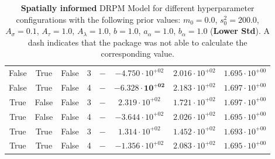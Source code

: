 \documentclass[12pt,a4paper]{article}
\begin{document}
\begin{table}
\begin{tabular}{cccccccc}
False & True & False & 3 & $-$ & $-4.750 \cdot 10^{+02}$ & $2.016 \cdot 10^{+02}$ & $1.695 \cdot 10^{+00}$ \\
False & True & False & 4 & $-$ & $\mathbf{-6.328 \cdot 10^{+02}}$ & $2.183 \cdot 10^{+02}$ & $1.697 \cdot 10^{+00}$ \\
True & False & False & 3 & $-$ & $2.319 \cdot 10^{+02}$ & $1.721 \cdot 10^{+02}$ & $1.697 \cdot 10^{+00}$ \\
True & False & False & 4 & $-$ & $-3.644 \cdot 10^{+02}$ & $2.026 \cdot 10^{+02}$ & $1.695 \cdot 10^{+00}$ \\
True & True & False & 3 & $-$ & $1.314 \cdot 10^{+02}$ & $1.452 \cdot 10^{+02}$ & $1.693 \cdot 10^{+00}$ \\
True & True & False & 4 & $-$ & $-1.356 \cdot 10^{+02}$ & $2.083 \cdot 10^{+02}$ & $1.695 \cdot 10^{+00}$ \\
\bottomrule
\end{tabular}
\caption{\textbf{Spatially informed} DRPM Model for different hyperparameter configurations with the following prior values: $m_0 = 0.0$, $s_0^2 
= 200.0$, $A_\sigma = 0.1$, $A_\tau = 1.0$, $A_\lambda = 1.0$, $b = 1.0$, $a_\alpha = 1.0$, $b_\alpha = 1.0$ (\textbf{Lower Std}).
A dash indicates that the package was not able to calculate the corresponding value.}
\label{tab:DRPMExtensionLowerStd}
\end{table}
\end{document}

